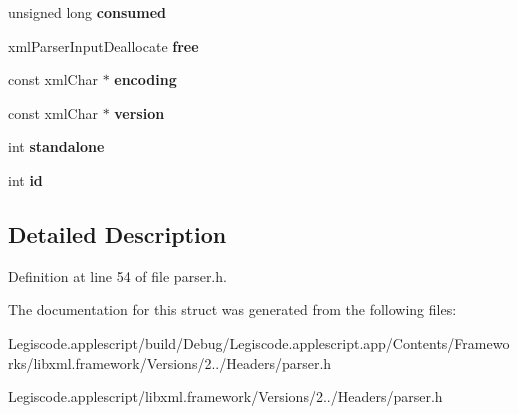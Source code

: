 \begin{DoxyCompactItemize}
\item 
\hypertarget{struct__xml_parser_input_aa4dbae4bbb1c3ffa212ad5d41402e587}{unsigned long {\bfseries consumed}}\label{struct__xml_parser_input_aa4dbae4bbb1c3ffa212ad5d41402e587}

\item 
\hypertarget{struct__xml_parser_input_a7c55373e42c374bc9df1c542274398fa}{xml\-Parser\-Input\-Deallocate {\bfseries free}}\label{struct__xml_parser_input_a7c55373e42c374bc9df1c542274398fa}

\item 
\hypertarget{struct__xml_parser_input_a5da2bb3d589073b7d472e6aa41ef4d81}{const xml\-Char $\ast$ {\bfseries encoding}}\label{struct__xml_parser_input_a5da2bb3d589073b7d472e6aa41ef4d81}

\item 
\hypertarget{struct__xml_parser_input_a83d340bb1a9cfacc2ac37ed0cc9d492d}{const xml\-Char $\ast$ {\bfseries version}}\label{struct__xml_parser_input_a83d340bb1a9cfacc2ac37ed0cc9d492d}

\item 
\hypertarget{struct__xml_parser_input_a2799e20f843ea79b753d9f8b60d4b793}{int {\bfseries standalone}}\label{struct__xml_parser_input_a2799e20f843ea79b753d9f8b60d4b793}

\item 
\hypertarget{struct__xml_parser_input_a20347691b442d481465e18f6777efecd}{int {\bfseries id}}\label{struct__xml_parser_input_a20347691b442d481465e18f6777efecd}

\end{DoxyCompactItemize}


\subsection{Detailed Description}


Definition at line 54 of file parser.\-h.



The documentation for this struct was generated from the following files\-:\begin{DoxyCompactItemize}
\item 
Legiscode.\-applescript/build/\-Debug/\-Legiscode.\-applescript.\-app/\-Contents/\-Frameworks/libxml.\-framework/\-Versions/2../\-Headers/parser.\-h\item 
Legiscode.\-applescript/libxml.\-framework/\-Versions/2../\-Headers/parser.\-h\end{DoxyCompactItemize}

